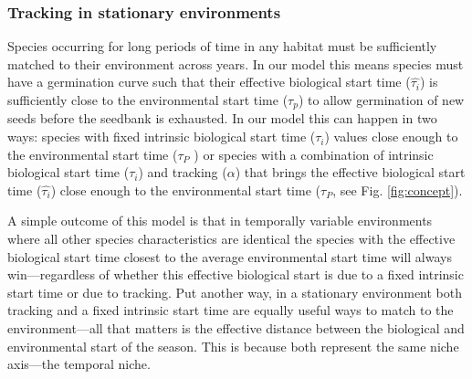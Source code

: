 \documentclass[11pt,letterpaper]{article}
\begin{document}
\subsubsection{Tracking in stationary environments}
Species occurring for long periods of time in any habitat must be sufficiently matched to their environment across years. In our model this means species must have a germination curve such that their effective biological start time ($\hat{\tau_{i}}$) is sufficiently close to the environmental start time ($\tau_{p}$) to allow germination of new seeds before the seedbank is exhausted. In our model this can happen in two ways: species with fixed intrinsic biological start time ($\tau_i$) values close enough to the environmental start time ($\tau_P$ ) or species with a combination of intrinsic biological start time ($\tau_i$) and tracking ($\alpha$) that brings the effective biological start time ($\hat{\tau_{i}}$) close enough to the environmental start time ($\tau_P$, see Fig. \ref{fig:concept}).

A simple outcome of this model is that in temporally variable environments where all other species characteristics are identical the species with the effective biological start time closest to the average environmental start time will always win---regardless of whether this effective biological start is due to a fixed intrinsic start time or due to tracking. Put another way, in a stationary environment both tracking and a fixed intrinsic start time are equally useful ways to match to the environment---all that matters is the effective distance between the biological and environmental start of the season. This is because both represent the same niche axis---the temporal niche. 
\end{document}
